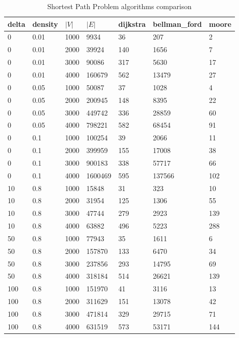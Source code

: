 \begin{table}[p]
\begin{tabular}{lllllll}
delta & density & $|V| $& $|E|$  & dijkstra & bellman\_ford & moore \\ \hline
0     & 0.01    & 1000 & 9934    & 36       & 207           & 2     \\
0     & 0.01    & 2000 & 39924   & 140      & 1656          & 7     \\
0     & 0.01    & 3000 & 90086   & 317      & 5630          & 17    \\
0     & 0.01    & 4000 & 160679  & 562      & 13479         & 27    \\
0     & 0.05    & 1000 & 50087   & 37       & 1028          & 4     \\
0     & 0.05    & 2000 & 200945  & 148      & 8395          & 22    \\
0     & 0.05    & 3000 & 449742  & 336      & 28859         & 60    \\
0     & 0.05    & 4000 & 798221  & 582      & 68454         & 91    \\
0     & 0.1     & 1000 & 100254  & 39       & 2066          & 11    \\
0     & 0.1     & 2000 & 399959  & 155      & 17008         & 38    \\
0     & 0.1     & 3000 & 900183  & 338      & 57717         & 66    \\
0     & 0.1     & 4000 & 1600469 & 595      & 137566        & 102   \\
10    & 0.8     & 1000 & 15848   & 31       & 323           & 10    \\
10    & 0.8     & 2000 & 31954   & 125      & 1306          & 55    \\
10    & 0.8     & 3000 & 47744   & 279      & 2923          & 139   \\
10    & 0.8     & 4000 & 63882   & 496      & 5223          & 288   \\
50    & 0.8     & 1000 & 77943   & 35       & 1611          & 6     \\
50    & 0.8     & 2000 & 157870  & 133      & 6470          & 34    \\
50    & 0.8     & 3000 & 237856  & 293      & 14795         & 69    \\
50    & 0.8     & 4000 & 318184  & 514      & 26621         & 139   \\
100   & 0.8     & 1000 & 151970  & 41       & 3116          & 13    \\
100   & 0.8     & 2000 & 311629  & 151      & 13078         & 42    \\
100   & 0.8     & 3000 & 471814  & 329      & 29715         & 71    \\
100   & 0.8     & 4000 & 631519  & 573      & 53171         & 144
\end{tabular}
\caption{Shortest Path Problem algorithms comparison}\label{table:spp}
\end{table}

